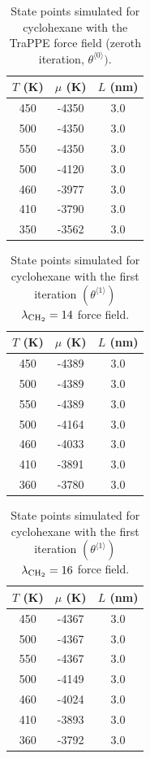 \documentclass[journal=jctc,manuscript=article]{achemso}
\begin{document}
\begin{table}[htb!]
	\caption{State points simulated for cyclohexane with the TraPPE force field (zeroth iteration, $\theta^{\langle0\rangle})$.}
	\begin{center}
		\begin{tabular}{|c|c|c|}
			\hline
			$T$ (K) & $\mu$ (K) & $L$ (nm) \\ \hline
			450	&	-4350	&	3.0	\\
			500	&	-4350	&	3.0	\\
			550	&	-4350	&	3.0	\\
			500	&	-4120	&	3.0	\\
			460	&	-3977	&	3.0	\\
			410	&	-3790	&	3.0	\\
			350	&	-3562	&	3.0	\\
			\hline
		\end{tabular}
	\end{center}
\end{table}

\begin{table}[htb!]
	\caption{State points simulated for cyclohexane with the first iteration $(\theta^{\langle1\rangle})$ $\lambda_{\rm CH_2} = 14$ force field.}
	\begin{center}
		\begin{tabular}{|c|c|c|}
			\hline
			$T$ (K) & $\mu$ (K) & $L$ (nm) \\ \hline
			450	&	-4389	&	3.0	\\
			500	&	-4389	&	3.0	\\
			550	&	-4389	&	3.0	\\
			500	&	-4164	&	3.0	\\
			460	&	-4033	&	3.0	\\
			410	&	-3891	&	3.0	\\
			360	&	-3780	&	3.0	\\
			\hline
		\end{tabular}
	\end{center}
\end{table}

\begin{table}[htb!]
	\caption{State points simulated for cyclohexane with the first iteration $(\theta^{\langle1\rangle})$ $\lambda_{\rm CH_2} = 16$ force field.}
	\begin{center}
		\begin{tabular}{|c|c|c|}
			\hline
			$T$ (K) & $\mu$ (K) & $L$ (nm) \\ \hline
			450	&	-4367	&	3.0	\\
			500	&	-4367	&	3.0	\\
			550	&	-4367	&	3.0	\\
			500	&	-4149	&	3.0	\\
			460	&	-4024	&	3.0	\\
			410	&	-3893	&	3.0	\\
			360	&	-3792	&	3.0	\\
			\hline
		\end{tabular}
	\end{center}
\end{table}
\end{document}
